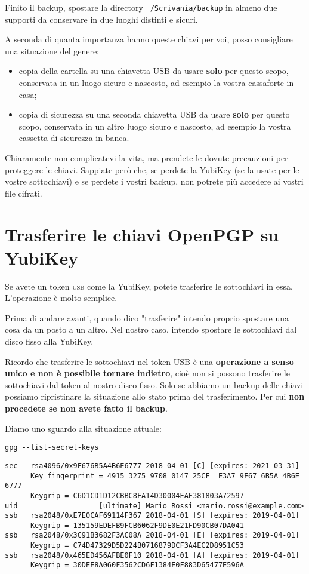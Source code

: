 \documentclass[a4paper,10pt]{article}
\begin{document}
Finito il backup, spostare la directory \texttt{~/Scrivania/backup} in almeno due supporti da conservare in due luoghi distinti e sicuri.

A seconda di quanta importanza hanno queste chiavi per voi, posso consigliare una situazione del genere:

\begin{itemize}
 \item copia della cartella su una chiavetta USB da usare \textbf{solo} per questo scopo, conservata in un luogo sicuro e nascosto, ad esempio la vostra cassaforte in casa;
 \item copia di sicurezza su una seconda chiavetta USB da usare \textbf{solo} per questo scopo, conservata in un altro luogo sicuro e nascosto, ad esempio la vostra cassetta di sicurezza in banca.
\end{itemize}

Chiaramente non complicatevi la vita, ma prendete le dovute precauzioni per proteggere le chiavi. Sappiate però che, se perdete la YubiKey (se la usate per le vostre sottochiavi) e se perdete i vostri backup, non potrete più accedere ai vostri file cifrati.

\section{Trasferire le chiavi OpenPGP su YubiKey}

Se avete un token \textsc{usb} come la YubiKey, potete trasferire le sottochiavi in essa. L'operazione è molto semplice.

Prima di andare avanti, quando dico "trasferire" intendo proprio spostare una cosa da un posto a un altro. Nel nostro caso, intendo spostare le sottochiavi dal disco fisso alla YubiKey.

Ricordo che trasferire le sottochiavi nel token USB è una \textbf{operazione a senso unico e non è possibile tornare indietro}, cioè non si possono trasferire le sottochiavi dal token al nostro disco fisso. Solo se abbiamo un backup delle chiavi possiamo ripristinare la situazione allo stato prima del trasferimento. Per cui \textbf{non procedete se non avete fatto il backup}.

Diamo uno sguardo alla situazione attuale:

\begin{lstlisting}
gpg --list-secret-keys
\end{lstlisting}

\begin{lstlisting}
sec   rsa4096/0x9F676B5A4B6E6777 2018-04-01 [C] [expires: 2021-03-31]
      Key fingerprint = 4915 3275 9708 0147 25CF  E3A7 9F67 6B5A 4B6E 6777
      Keygrip = C6D1CD1D12CBBC8FA14D30004EAF381803A72597
uid                   [ultimate] Mario Rossi <mario.rossi@example.com>
ssb   rsa2048/0xE7E0CAF69114F367 2018-04-01 [S] [expires: 2019-04-01]
      Keygrip = 135159EDEFB9FCB6062F9DE0E21FD90CB07DA041
ssb   rsa2048/0x3C91B3682F3AC08A 2018-04-01 [E] [expires: 2019-04-01]
      Keygrip = C74D47329D5D224B0716879DCF3A4EC2D8951C53
ssb   rsa2048/0x465ED456AFBE0F10 2018-04-01 [A] [expires: 2019-04-01]
      Keygrip = 30DEE8A060F3562CD6F1384E0F883D65477E596A
\end{lstlisting}
\end{document}
